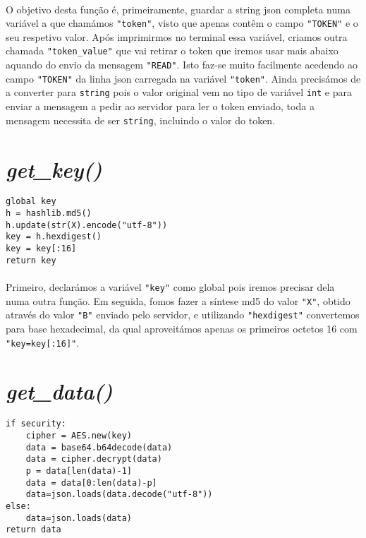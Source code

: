 \documentclass[a4paper]{report}
\begin{document}
\paragraph{}O objetivo desta função é, primeiramente, guardar a string \ac{json} completa numa variável a que chamámos \texttt{"token"}, visto que apenas contêm o campo \texttt{"TOKEN"} e o seu respetivo valor.
Após imprimirmos no terminal essa variável, criamos outra chamada \texttt{"token\_value"} que vai retirar o token que iremos usar mais abaixo aquando do envio da mensagem \texttt{"READ"}. Isto faz-se muito facilmente acedendo ao campo \texttt{"TOKEN"} da linha \ac{json} carregada na variável \texttt{"token"}. Ainda precisámos de a converter para \texttt{string} pois o valor original vem no tipo de variável \texttt{int} e para enviar a mensagem a pedir ao servidor para ler o token enviado, toda a mensagem necessita de ser \texttt{string}, incluindo o valor do token.

\newpage

\section{\textit{get\_key()}}
\label{sec.key}
\begin{lstlisting}
global key
h = hashlib.md5()
h.update(str(X).encode("utf-8"))
key = h.hexdigest()
key = key[:16]
return key
\end{lstlisting}
\paragraph{}Primeiro, declarámos a variável \texttt{"key"} como global pois iremos precisar dela numa outra função. Em seguida, fomos fazer a síntese \ac{md5} do valor \texttt{"X"}, obtido através do valor \texttt{"B"} enviado pelo servidor, e utilizando \texttt{"hexdigest"} convertemos para base hexadecimal, da qual aproveitámos apenas os primeiros octetos 16 com \texttt{"key=key[:16]"}.\cite{guiao}

\newpage

\section{\textit{get\_data()}}
\label{sec.data}
\begin{lstlisting}
if security:
    cipher = AES.new(key)
    data = base64.b64decode(data)
    data = cipher.decrypt(data)
    p = data[len(data)-1]
    data = data[0:len(data)-p]
    data=json.loads(data.decode("utf-8"))
else:
    data=json.loads(data)
return data
\end{lstlisting}
\end{document}

